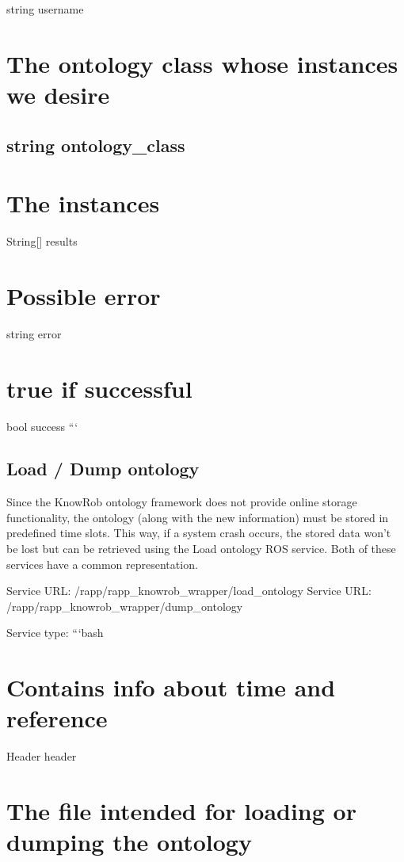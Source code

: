 string username \section*{The ontology class whose instances we desire}

\subsection*{string ontology\-\_\-class }

\section*{The instances}

String\mbox{[}\mbox{]} results \section*{Possible error}

string error \section*{true if successful}

bool success ```

\subsection*{Load / Dump ontology}

Since the Know\-Rob ontology framework does not provide online storage functionality, the ontology (along with the new information) must be stored in predefined time slots. This way, if a system crash occurs, the stored data won’t be lost but can be retrieved using the Load ontology R\-O\-S service. Both of these services have a common representation.

Service U\-R\-L\-: {\ttfamily /rapp/rapp\-\_\-knowrob\-\_\-wrapper/load\-\_\-ontology} Service U\-R\-L\-: {\ttfamily /rapp/rapp\-\_\-knowrob\-\_\-wrapper/dump\-\_\-ontology}

Service type\-: ```bash \section*{Contains info about time and reference}

Header header \section*{The file intended for loading or dumping the ontology}

